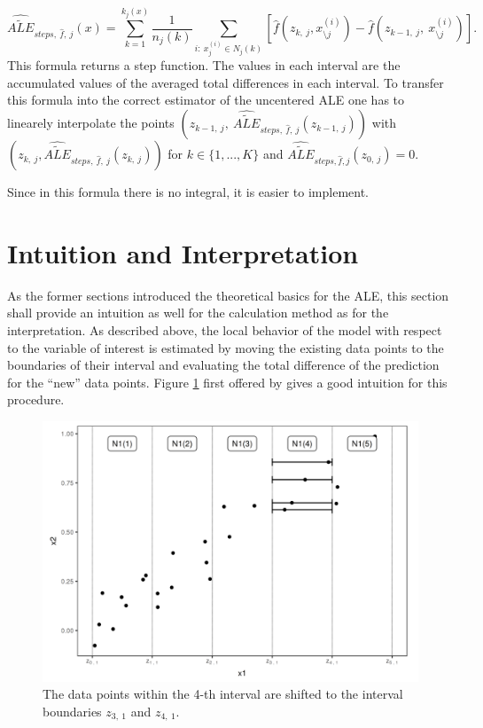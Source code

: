 \documentclass[]{krantz}
\begin{document}
\[  \widehat{\widetilde{ALE}}_{steps,~\hat{f},~j}(x) =  \sum_{k=1}^{k_j(x)}   \frac{1}{n_j(k)}\sum_{i:~x_j^{(i)}\in N_j(k)} [\hat{f}(z_{k,~j}, x_{\setminus j}^{(i)})-\hat{f}(z_{k-1,~j},~x_{\setminus j}^{(i)})].  \]
This formula returns a step function. The values in each interval are
the accumulated values of the averaged total differences in each
interval. To transfer this formula into the correct estimator of the
uncentered ALE one has to linearely interpolate the points
\((z_{k-1,~j},~\widehat{\widetilde{ALE}}_{steps,~\hat{f},~j}(z_{k-1,~j}))\)
with
\(( z_{k,~j},\widehat{\widetilde{ALE}}_{steps,~ \hat{f},~j}(z_{k,~j}))\)
for \(k \in \{1, ..., K \}\) and
\(\widehat{\widetilde{ALE}}_{steps, \hat{f},j}(z_{0,~j}) = 0\).

Since in this formula there is no integral, it is easier to implement.

\section{Intuition and Interpretation}\label{ale-intro-interpret}

As the former sections introduced the theoretical basics for the ALE,
this section shall provide an intuition as well for the calculation
method as for the interpretation. As described above, the local behavior
of the model with respect to the variable of interest is estimated by
moving the existing data points to the boundaries of their interval and
evaluating the total difference of the prediction for the ``new'' data
points. Figure \ref{fig:dataALE} first offered by \citep{molnar2019}
gives a good intuition for this procedure.

\begin{figure}
\includegraphics[width=1\linewidth]{images/ale_estimation_intuition} \caption{The data points within the 4-th interval are shifted
to the interval boundaries \(z_{3,~1}\) and \(z_{4,~1}\).}\label{fig:dataALE}
\end{figure}
\end{document}

